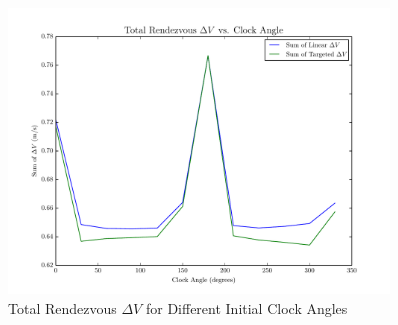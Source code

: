 \documentclass[letterpaper, preprint, paper,11pt]{AAS}	%
\begin{document}
\begin{figure}[h] 
	\begin{center}
		\includegraphics[width=0.9\textwidth]{Total_DV_2} 
		\caption{Total Rendezvous \(\Delta V\) for Different Initial Clock Angles}
		\label{fig:DV_2}
	\end{center}
\end{figure}









\end{document}
